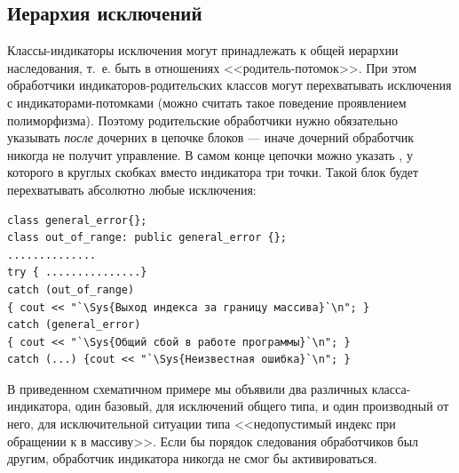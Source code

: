 \subsection[Иерархия исключений]{Иерархия исключений}
Классы-индикаторы исключения могут принадлежать к общей иерархии наследования, т.~е. быть в отношениях
<<родитель-потомок>>. При этом обработчики индикаторов-родительских классов могут перехватывать исключения с
индикаторами-потомками (можно считать такое поведение проявлением полиморфизма). Поэтому родительские обработчики нужно
обязательно указывать \emph{после} дочерних в цепочке блоков  --- иначе
дочерний обработчик никогда не получит управление. В самом конце цепочки можно указать , у
которого в круглых скобках вместо индикатора три точки. Такой блок будет перехватывать абсолютно любые исключения:
\begin{lstlisting}
class general_error{};
class out_of_range: public general_error {};
..............
try { ...............}
catch (out_of_range) 
{ cout << "`\Sys{Выход индекса за границу массива}`\n"; }
catch (general_error) 
{ cout << "`\Sys{Общий сбой в работе программы}`\n"; }
catch (...) {cout << "`\Sys{Неизвестная ошибка}`\n"; }
\end{lstlisting}

В приведенном схематичном примере мы объявили два различных класса-индикатора, один базовый, для исключений общего типа,
и один производный от него, для исключительной ситуации типа <<недопустимый индекс при обращении к в массиву>>. Если бы
порядок следования обработчиков был другим, обработчик индикатора  никогда не смог
бы активироваться.


